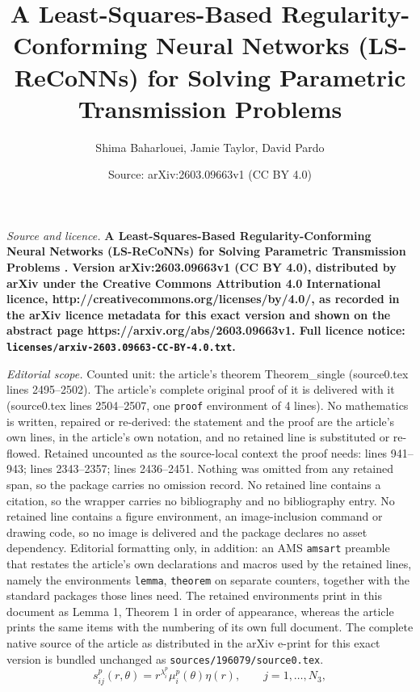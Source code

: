 \documentclass[10pt,a4paper]{amsart}
\title{\bf{A Least-Squares-Based Regularity-Conforming Neural Networks (LS-ReCoNNs) for Solving Parametric Transmission Problems }}
\author{Shima Baharlouei, Jamie Taylor, David Pardo}
\date{Source: arXiv:2603.09663v1 (CC BY 4.0)}
\begin{document}
\maketitle

\noindent\emph{Source and licence.} \bf{A Least-Squares-Based Regularity-Conforming Neural Networks (LS-ReCoNNs) for Solving Parametric Transmission Problems }. Version arXiv:2603.09663v1 (CC BY 4.0), distributed by arXiv under the Creative Commons Attribution 4.0 International licence, http://creativecommons.org/licenses/by/4.0/, as recorded in the arXiv licence metadata for this exact version and shown on the abstract page https://arxiv.org/abs/2603.09663v1. Full licence notice: \texttt{licenses/arxiv-2603.09663-CC-BY-4.0.txt}.\par\smallskip

\noindent\textit{Editorial scope.} Counted unit: the article's theorem Theorem\_single (source0.tex lines 2495--2502). The article's complete original proof of it is delivered with it (source0.tex lines 2504--2507, one \texttt{proof} environment of 4 lines). No mathematics is written, repaired or re-derived: the statement and the proof are the article's own lines, in the article's own notation, and no retained line is substituted or re-flowed.  Retained uncounted as the source-local context the proof needs: lines 941--943; lines 2343--2357; lines 2436--2451.  Nothing was omitted from any retained span, so the package carries no omission record.  No retained line contains a citation, so the wrapper carries no bibliography and no bibliography entry.  No retained line contains a figure environment, an image-inclusion command or drawing code, so no image is delivered and the package declares no asset dependency.  Editorial formatting only, in addition: an AMS \texttt{amsart} preamble that restates the article's own declarations and macros used by the retained lines, namely the environments \texttt{lemma}, \texttt{theorem} on separate counters, together with the standard packages those lines need.  The retained environments print in this document as Lemma 1, Theorem 1 in order of appearance, whereas the article prints the same items with the numbering of its own full document.  The complete native source of the article as distributed in the arXiv e-print for this exact version is bundled unchanged as \texttt{sources/196079/source0.tex}.
\begin{equation}\label{eq2_sjp}
s_{ij}^p(r, \theta) = r^{\lambda_i^p} \mu_i^p(\theta) \eta(r), \qquad j = 1, \ldots, N_3,
\end{equation}
\end{document}
